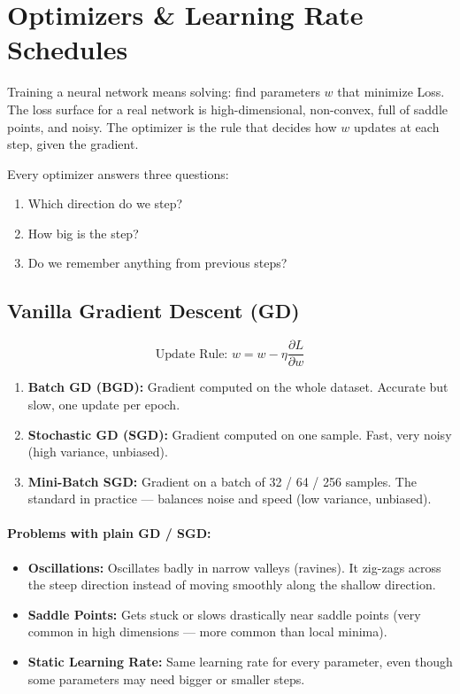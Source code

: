 \clearpage

\section{Optimizers \& Learning Rate Schedules}

Training a neural network means solving: find parameters $w$ that minimize Loss. The loss surface for a real network is high-dimensional, non-convex, full of saddle points, and noisy. The optimizer is the rule that decides how $w$ updates at each step, given the gradient.

Every optimizer answers three questions:
\begin{enumerate}
    \item Which direction do we step?
    \item How big is the step?
    \item Do we remember anything from previous steps?
\end{enumerate}

\subsection{Vanilla Gradient Descent (GD)}

\begin{equation}
\text{Update Rule: } w = w - \eta \frac{\partial L}{\partial w}
\end{equation}

\begin{enumerate}[label=\Roman*.]
    \item \textbf{Batch GD (BGD):} Gradient computed on the whole dataset. Accurate but slow, one update per epoch.
    \item \textbf{Stochastic GD (SGD):} Gradient computed on one sample. Fast, very noisy (high variance, unbiased).
    \item \textbf{Mini-Batch SGD:} Gradient on a batch of 32 / 64 / 256 samples. The standard in practice — balances noise and speed (low variance, unbiased).
\end{enumerate}

\paragraph{Problems with plain GD / SGD:}
\begin{itemize}
    \item \textbf{Oscillations:} Oscillates badly in narrow valleys (ravines). It zig-zags across the steep direction instead of moving smoothly along the shallow direction.
    \item \textbf{Saddle Points:} Gets stuck or slows drastically near saddle points (very common in high dimensions — more common than local minima).
    \item \textbf{Static Learning Rate:} Same learning rate for every parameter, even though some parameters may need bigger or smaller steps.
\end{itemize}

